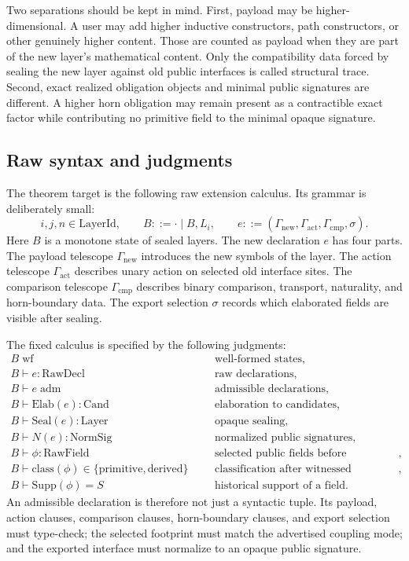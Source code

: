 \documentclass{lmcs}
\begin{document}
Two separations should be kept in mind.  First, payload may be higher-dimensional.  A user
may add higher inductive constructors, path constructors, or other genuinely higher content.
Those are counted as payload when they are part of the new layer's mathematical content.
Only the compatibility data forced by sealing the new layer against old public interfaces is
called structural trace.  Second, exact realized obligation objects and minimal public
signatures are different.  A higher horn obligation may remain present as a contractible exact
factor while contributing no primitive field to the minimal opaque signature.

\subsection{Raw syntax and judgments}

The theorem target is the following raw extension calculus.  Its grammar is deliberately
small:
\[
  i,j,n \in \mathrm{LayerId},
  \qquad
  B ::= \cdot \mid B,L_i,
  \qquad
  e ::= (\Gamma_{\mathrm{new}},\Gamma_{\mathrm{act}},\Gamma_{\mathrm{cmp}},\sigma).
\]
Here \(B\) is a monotone state of sealed layers.  The new declaration \(e\) has four parts.
The payload telescope \(\Gamma_{\mathrm{new}}\) introduces the new symbols of the layer.  The
action telescope \(\Gamma_{\mathrm{act}}\) describes unary action on selected old interface
sites.  The comparison telescope \(\Gamma_{\mathrm{cmp}}\) describes binary comparison,
transport, naturality, and horn-boundary data.  The export selection \(\sigma\) records which
elaborated fields are visible after sealing.

The fixed calculus is specified by the following judgments:
\[
\begin{array}{rcll}
  B\;\mathrm{wf} &&& \text{well-formed states},\\
  B\vdash e:\mathrm{RawDecl} &&& \text{raw declarations},\\
  B\vdash e\;\mathrm{adm} &&& \text{admissible declarations},\\
  B\vdash \mathrm{Elab}(e):\mathrm{Cand} &&& \text{elaboration to candidates},\\
  B\vdash \mathrm{Seal}(e):\mathrm{Layer} &&& \text{opaque sealing},\\
  B\vdash N(e):\mathrm{NormSig} &&& \text{normalized public signatures},\\
  B\vdash \phi:\mathrm{RawField} &&& \text{selected public fields before classification},\\
  B\vdash \mathrm{class}(\phi)\in\{\mathrm{primitive},\mathrm{derived}\}
    &&& \text{classification after witnessed replacement and normalization},\\
  B\vdash \mathrm{Supp}(\phi)=S &&& \text{historical support of a field}. 
\end{array}
\]
An admissible declaration is therefore not just a syntactic tuple.  Its payload, action
clauses, comparison clauses, horn-boundary clauses, and export selection must type-check;
the selected footprint must match the advertised coupling mode; and the exported interface
must normalize to an opaque public signature.
\end{document}
